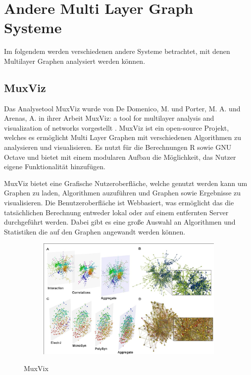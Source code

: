 \section{Andere Multi Layer Graph Systeme}

Im folgendem werden verschiedenen andere Systeme betrachtet, mit denen Multilayer Graphen analysiert werden können.

\subsection{MuxViz}

Das Analysetool MuxViz wurde von De Domenico, M. und Porter, M. A. und Arenas, A. in ihrer Arbeit MuxViz: a tool for multilayer analysis and visualization of networks vorgestellt \cite{De_Domenico_2014}.
MuxViz ist ein open-source Projekt, welches es ermöglicht Multi Layer Graphen mit verschiedenen Algorithmen zu analysieren und visualisieren. Es nutzt für die Berechnungen R sowie GNU Octave und bietet mit einem modularen Aufbau die Möglichkeit, das Nutzer eigene Funktionalität hinzufügen.


MuxViz bietet eine Grafische Nutzeroberfläche, welche genutzt werden kann um Graphen zu laden, Algorithmen auzuführen und Graphen sowie Ergebnisse zu visualisieren. Die Benutzeroberfläche ist Webbasiert, was ermöglicht das die tatsächlichen Berechnung entweder lokal oder auf einem entfernten Server durchgeführt werden.
Dabei gibt es eine große Auswahl an Algorithmen und Statistiken die auf den Graphen angewandt werden können.


\begin{figure}
  \centering
  \begin{subfigure}[b]{1.0\textwidth}
    \includegraphics[width=1.0\linewidth]{img/muxViz.png}
  \end{subfigure}
  \caption{MuxVix}
  \label{muxVizSample}
\end{figure}

